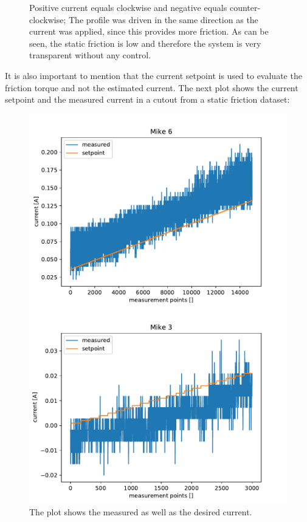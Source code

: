 \begin{figure}[h]
\begin{minipage}[m]{0.48\textwidth}
    \end{minipage}
    \caption{Positive current equals clockwise and negative equals counter-clockwise; The profile was driven in the same direction as the current was applied, since this provides more friction. As can be seen, the static friction is low and therefore the system is very transparent without any control.}
\end{figure}

It is also important to mention that the current setpoint is used to evaluate the friction torque and not the estimated current. The next plot shows the current setpoint and the measured current in a cutout from a static friction dataset: 

\begin{figure}[h]
    \begin{minipage}[m]{0.48\textwidth}
     \centering
        \includegraphics[width = \textwidth]{chapters/static friction/current.pdf}
    \end{minipage}
    \hfill
    \begin{minipage}[m]{0.48\textwidth}
     \centering
        \includegraphics[width = \textwidth]{chapters/static friction/current_3.pdf}
    \end{minipage}
    \caption{The plot shows the measured as well as the desired current.}
\end{figure}

